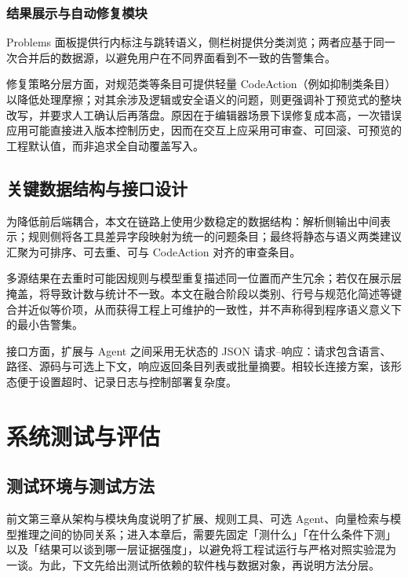 \subsubsection{结果展示与自动修复模块}

Problems 面板提供行内标注与跳转语义，侧栏树提供分类浏览；两者应基于同一次合并后的数据源，以避免用户在不同界面看到不一致的告警集合。

修复策略分层方面，对规范类等条目可提供轻量 CodeAction（例如抑制类条目）以降低处理摩擦；对其余涉及逻辑或安全语义的问题，则更强调补丁预览式的整块改写，并要求人工确认后再落盘。原因在于编辑器场景下误修复成本高，一次错误应用可能直接进入版本控制历史，因而在交互上应采用可审查、可回滚、可预览的工程默认值，而非追求全自动覆盖写入。

\subsection{关键数据结构与接口设计}

为降低前后端耦合，本文在链路上使用少数稳定的数据结构：解析侧输出中间表示；规则侧将各工具差异字段映射为统一的问题条目；最终将静态与语义两类建议汇聚为可排序、可去重、可与 CodeAction 对齐的审查条目\cite{microsoft2025vscodeapi}。

多源结果在去重时可能因规则与模型重复描述同一位置而产生冗余；若仅在展示层掩盖，将导致计数与统计不一致。本文在融合阶段以类别、行号与规范化简述等键合并近似等价项，从而获得工程上可维护的一致性，并不声称得到程序语义意义下的最小告警集。

接口方面，扩展与 Agent 之间采用无状态的 JSON 请求–响应：请求包含语言、路径、源码与可选上下文，响应返回条目列表或批量摘要\cite{rfc9110,rfc8259}。相较长连接方案，该形态便于设置超时、记录日志与控制部署复杂度。

\newpage

\section{系统测试与评估}

\subsection{测试环境与测试方法}

前文第三章从架构与模块角度说明了扩展、规则工具、可选 Agent、向量检索与模型推理之间的协同关系；进入本章后，需要先固定「测什么」「在什么条件下测」以及「结果可以谈到哪一层证据强度」，以避免将工程试运行与严格对照实验混为一谈\cite{myers2015art}。为此，下文先给出测试所依赖的软件栈与数据对象，再说明方法分层。

